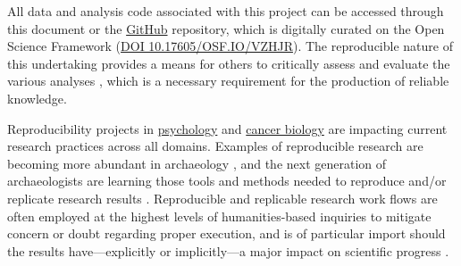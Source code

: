 \documentclass[]{interact}
\theoremstyle{plain}%
\theoremstyle{definition}
\theoremstyle{remark}
\begin{document}
All data and analysis code associated with this project can be accessed
through this document or the
\href{https://seldenlab.github.io/anthro.zoo/}{GitHub} repository, which
is digitally curated on the Open Science Framework
(\href{https://osf.io/vzhjr/}{DOI 10.17605/OSF.IO/VZHJR}). The
reproducible nature of this undertaking provides a means for others to
critically assess and evaluate the various analyses
\citep{RN20915,RN20916,RN20917}, which is a necessary requirement for
the production of reliable knowledge.

Reproducibility projects in \href{https://osf.io/ezcuj/}{psychology} and
\href{https://www.cos.io/rpcb}{cancer biology} are impacting current
research practices across all domains. Examples of reproducible research
are becoming more abundant in archaeology
\citep{RN20804,RN21009,RN21001,RN9364,RN11264}, and the next generation
of archaeologists are learning those tools and methods needed to
reproduce and/or replicate research results \citep{RN21007}.
Reproducible and replicable research work flows are often employed at
the highest levels of humanities-based inquiries to mitigate concern or
doubt regarding proper execution, and is of particular import should the
results have---explicitly or implicitly---a major impact on scientific
progress \citep{RN21008}.






\end{document}
